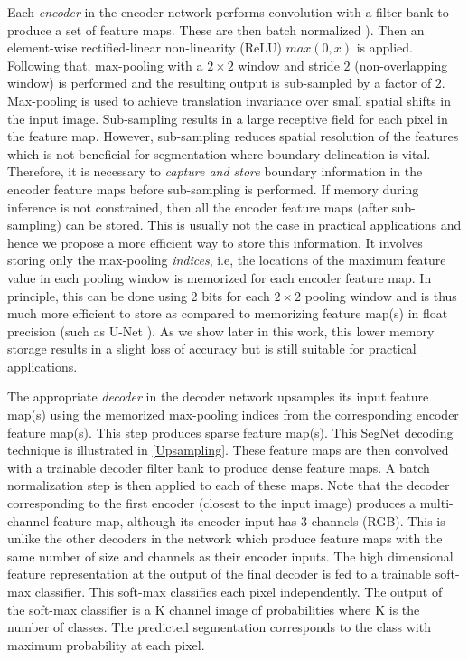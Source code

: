 Each \textit{encoder} in the encoder network performs convolution with a filter bank to produce a set of feature maps. These are then batch normalized \citep{BN}). Then an element-wise rectified-linear non-linearity (ReLU) $max(0,x)$ is applied. Following that, max-pooling with a $2\times2$ window and stride $2$ (non-overlapping window) is performed and the resulting output is sub-sampled by a factor of $2$. Max-pooling is used to achieve translation invariance over small spatial shifts in the input image. Sub-sampling results in a large receptive field for each pixel in the feature map. However, sub-sampling reduces spatial resolution of the features which is not beneficial for segmentation where boundary delineation is vital. Therefore, it is necessary to \textit{capture and store} boundary information in the encoder feature maps before sub-sampling is performed. If memory during inference is not constrained, then all the encoder feature maps (after sub-sampling) can be stored. This is usually not the case in practical applications and hence we propose a more efficient way to store this information. It involves storing only the max-pooling \textit{indices}, i.e, the locations of the maximum feature value in each pooling window is memorized for each encoder feature map. In principle, this can be done using 2 bits for each $2\times2$ pooling window and is thus much more efficient to store as compared to memorizing feature map(s) in float precision (such as U-Net \citep{ronneberger2015u}). As we show later in this work, this lower memory storage results in a slight loss of accuracy but is still suitable for practical applications.

The appropriate \textit{decoder} in the decoder network upsamples its input feature map(s) using the memorized max-pooling indices from the corresponding encoder feature map(s). This step produces sparse feature map(s). This SegNet decoding technique is illustrated in \cref{Upsampling}. These feature maps are then convolved with a trainable decoder filter bank to produce dense feature maps. A batch normalization step is then applied to each of these maps. Note that the decoder corresponding to the first encoder (closest to the input image) produces a multi-channel feature map, although its encoder input has 3 channels (RGB). This is unlike the other decoders in the network which produce feature maps with the same number of size and channels as their encoder inputs. The high dimensional feature representation at the output of the final decoder is fed to a trainable soft-max classifier. This soft-max classifies each pixel independently. The output of the soft-max classifier is a K channel image of probabilities where K is the number of classes. The predicted segmentation corresponds to the class with maximum probability at each pixel.

